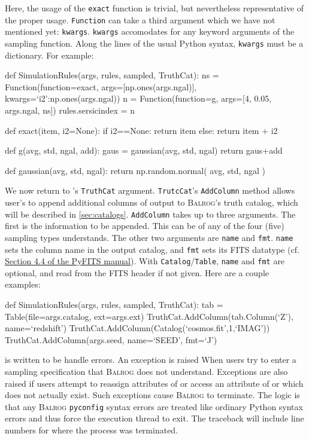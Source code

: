 \documentclass[11pt]{book}
\newcommand{\codett}[1]{\texttt{#1}}
\newcommand{\py}{Python}
\newcommand{\pyconfig}{\codett{pyconfig}}
\newcommand{\balrog}{\textsc{Balrog}}
\newcommand{\cf}{cf.}
\begin{document}
\noindent Here, the usage of the \codett{exact} function is trivial, but nevertheless
representative of the proper usage.
\codett{Function} can take a third argument which we have not mentioned yet: \codett{kwargs}.
\codett{kwargs} accomodates for any keyword arguments of the sampling function.
Along the lines of the usual \py{} syntax, \codett{kwargs} must be a dictionary.
For example:

\begin{code}
def SimulationRules(args, rules, sampled, TruthCat):
    ns = Function(function=exact, args=[np.ones(args.ngal)], kwargs={`i2':np.ones(args.ngal)})
    n = Function(function=g, args=[4, 0.05, args.ngal, ns])
    rules.sersicindex = n

def exact(item, i2=None):
    if i2==None:
        return item
    else:
        return item + i2

def g(avg, std, ngal, add):
    gaus = gaussian(avg, std, ngal)
    return gaus+add

def gaussian(avg, std, ngal):
    return np.random.normal( avg, std, ngal )
\end{code}


\hypertarget{hyper:addtruth}{}
We now return to \simfunc{}'s \codett{TruthCat} argument.
\codett{TrutcCat}'s \codett{AddColumn} method allows user's to append additional columns of output
to \balrog{}'s truth catalog, which will be described in \autoref{sec:catalogs}.
\codett{AddColumn} takes up to three arguments.
The first is the information to be appended. This can be of any of the four (five) sampling types \simrules{} understands.
The other two arguments are \codett{name} and \codett{fmt}.
\codett{name} sets the column name in the output catalog, and \codett{fmt} sets its FITS datatype 
(\cf{} \href{http://www.ast.uct.ac.za/~ims/teaching/comp\_astron/python\_manuals/pyfits\_manual.pdf}{Section 4.4 of the PyFITS manual}).
With \codett{Catalog}/\codett{Table}, \codett{name} and \codett{fmt} are optional, and read from the FITS header if not given.
Here are a couple examples:
\begin{code}
def SimulationRules(args, rules, sampled, TruthCat):
    tab = Table(file=args.catalog, ext=args.ext)
    TruthCat.AddColumn(tab.Column(`Z'), name=`redshift')
    TruthCat.AddColumn(Catalog(`cosmos.fit',1,`IMAG'))
    TruthCat.AddColumn(args.seed, name=`SEED', fmt=`J')
\end{code}

\simfunc{} is written to be handle errors.
An exception is raised When users try to enter a sampling specification that \balrog{} does not understand.
Exceptions are also raised if users attempt to reassign attributes of \simsamp{} or 
access an attribute of \simrules{} or \simsamp{} which does not actually exist.
Such exceptions cause \balrog{} to terminate.
The logic is that any \balrog{} \pyconfig{} syntax errors are treated like ordinary \py{} syntax
errors and thus force the execution thread to exit.
The traceback will include line numbers for where the process was terminated.
\end{document}
